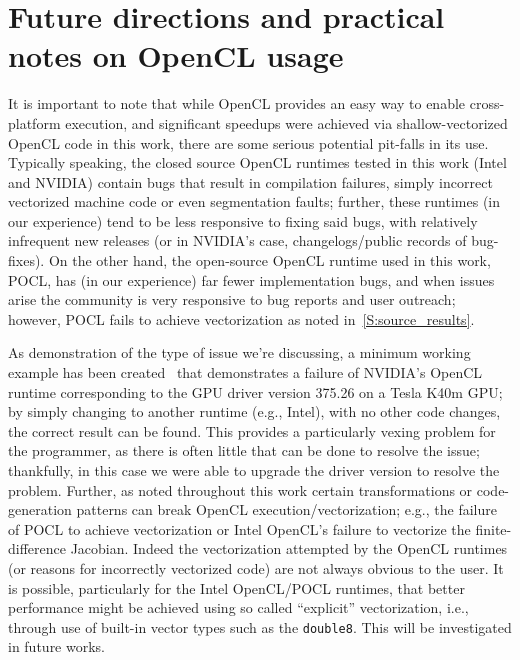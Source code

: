 \documentclass[12pt,number,sort&compress,preprint]{elsarticle}
\begin{document}
\section{Future directions and practical notes on OpenCL usage}
\label{s:future}
It is important to note that while OpenCL provides an easy way to enable cross-platform execution, and significant speedups were achieved via shallow-vectorized OpenCL code in this work, there are some serious potential pit-falls in its use.
Typically speaking, the closed source OpenCL runtimes tested in this work (Intel and NVIDIA) contain bugs that result in compilation failures, simply incorrect vectorized machine code or even segmentation faults; further, these runtimes (in our experience) tend to be less responsive to fixing said bugs, with relatively infrequent new releases (or in NVIDIA's case, changelogs\slash public records of bug-fixes).
On the other hand, the open-source OpenCL runtime used in this work, POCL, has (in our experience) far fewer implementation bugs, and when issues arise the community is very responsive to bug reports and user outreach; however, POCL fails to achieve vectorization as noted in~\cref{S:source_results}.

As demonstration of the type of issue we're discussing, a minimum working example has been created~\cite{nvidia_mwe} that demonstrates a failure of NVIDIA's OpenCL runtime corresponding to the GPU driver version \num{375.26} on a Tesla K40m GPU; by simply changing to another runtime (e.g., Intel), with no other code changes, the correct result can be found.
This provides a particularly vexing problem for the programmer, as there is often little that can be done to resolve the issue; thankfully, in this case we were able to upgrade the driver version to resolve the problem.
Further, as noted throughout this work certain transformations or code-generation patterns can break OpenCL execution\slash vectorization; e.g., the failure of POCL to achieve vectorization or Intel OpenCL's failure to vectorize the finite-difference Jacobian.
Indeed the vectorization attempted by the OpenCL runtimes (or reasons for incorrectly vectorized code) are not always obvious to the user.
It is possible, particularly for the Intel OpenCL\slash POCL runtimes, that better performance might be achieved using so called ``explicit'' vectorization, i.e., through use of built-in vector types such as the \texttt{double8}.
This will be investigated in future works.
\end{document}
